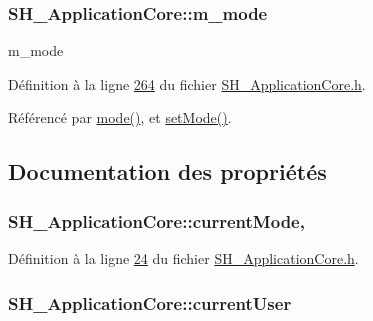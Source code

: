 \hypertarget{classSH__ApplicationCore_ac9587a451ab2294abe7a9eb738d93cb0}{
\subsubsection[{m\-\_\-mode}]{ S\-H\-\_\-\-Application\-Core\-::m\-\_\-mode\hspace{0.3cm}{\ttfamily [private]}}}\label{classSH__ApplicationCore_ac9587a451ab2294abe7a9eb738d93cb0}


m\-\_\-mode 



Définition à la ligne \hyperlink{SH__ApplicationCore_8h_source_l00264}{264} du fichier \hyperlink{SH__ApplicationCore_8h_source}{S\-H\-\_\-\-Application\-Core.\-h}.



Référencé par \hyperlink{classSH__ApplicationCore_a210295d4d7a6e16e9def6e0a29816b51}{mode()}, et \hyperlink{classSH__ApplicationCore_aeb87d289ccc9c8209928f23cf8a02ead}{set\-Mode()}.



\subsection{Documentation des propriétés}
\hypertarget{classSH__ApplicationCore_ac83ee9ad9c649105eb8eac5fac74b951}{
\subsubsection[{current\-Mode}]{\setlength{\rightskip}{0pt plus 5cm}S\-H\-\_\-\-Application\-Core\-::current\-Mode\hspace{0.3cm}{\ttfamily [read]}, {\ttfamily [write]}}}\label{classSH__ApplicationCore_ac83ee9ad9c649105eb8eac5fac74b951}


Définition à la ligne \hyperlink{SH__ApplicationCore_8h_source_l00024}{24} du fichier \hyperlink{SH__ApplicationCore_8h_source}{S\-H\-\_\-\-Application\-Core.\-h}.

\hypertarget{classSH__ApplicationCore_aaa2609e7bcda83fd65b602e7e211b027}{
\subsubsection[{current\-User}]{\setlength{\rightskip}{0pt plus 5cm}S\-H\-\_\-\-Application\-Core\-::current\-User\hspace{0.3cm}{\ttfamily [read]}}}\label{classSH__ApplicationCore_aaa2609e7bcda83fd65b602e7e211b027}


